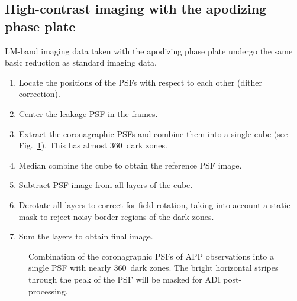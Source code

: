 \subsection{High-contrast imaging with the apodizing phase plate}
\label{ssec:algo_app_imaging}

LM-band imaging data taken with the apodizing phase plate undergo the
same basic reduction as standard imaging data. 



\begin{enumerate}
\item Locate the positions of the PSFs with respect to each other
  (dither correction).
\item Center the leakage PSF in the frames.
\item Extract the coronagraphic PSFs and combine them into a single
  cube (see Fig.~\ref{fig:app_psf_combine}). This has almost
  360\degr\ dark zones.
\item Median combine the cube to obtain the reference PSF image.
\item Subtract PSF image from all layers of the cube.
\item Derotate all layers to correct for field rotation, taking into
  account a static mask to reject noisy border regions of the dark
  zones.
\item Sum the layers to obtain final image.
\end{enumerate}

\begin{figure}
  \centering
    \caption[Combination of the coronagraphic PSFs of APP observations into a single PSF]{%
        Combination of the coronagraphic PSFs of APP observations
        into a single PSF with nearly 360\degr\ dark zones. The bright
        horizontal stripes through the peak of the PSF will be masked for
        ADI post-processing.}
  \label{fig:app_psf_combine}
\end{figure}

